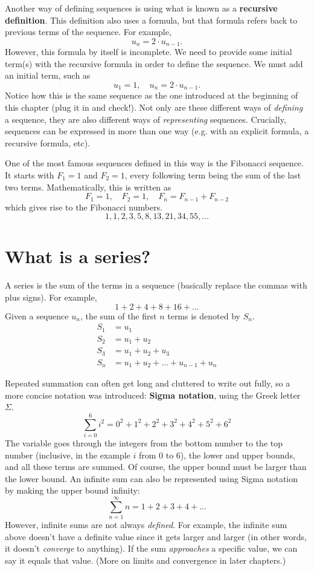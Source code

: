 \documentclass[../../main.tex]{subfiles}
\begin{document}
Another way of defining sequences is using what is known as a \textbf{recursive definition}. This definition also uses a formula, but that formula refers back to previous terms of the sequence. For example,
\[
    u_n = 2\cdot u_{n-1}.
\]
However, this formula by itself is incomplete. We need to provide some initial term(s) with the recursive formula in order to define the sequence. We must add an initial term, such as
\[
    u_1 = 1,\quad u_n = 2\cdot u_{n-1}.
\]
Notice how this is the same sequence as the one introduced at the beginning of this chapter (plug it in and check!). Not only are these different ways of \emph{defining} a sequence, they are also different ways of \emph{representing} sequences. Crucially, sequences can be expressed in more than one way (e.g. with an explicit formula, a recursive formula, etc).

One of the most famous sequences defined in this way is the Fibonacci sequence. It starts with \(F_1 = 1\) and \(F_2 = 1\), every following term being the sum of the last two terms. Mathematically, this is written as
\[
    F_1 = 1,\quad F_2 = 1,\quad F_n = F_{n-1} + F_{n-2}
\]
which gives rise to the Fibonacci numbers.
\[
    1, 1, 2, 3, 5, 8, 13, 21, 34, 55, \ldots
\]

\section{What is a series?}

A series is the sum of the terms in a sequence (basically replace the commas with plus signs). For example,
\[
    1+2+4+8+16+\ldots
\]
Given a sequence \( u_n\), the sum of the first \(n\) terms is denoted by \(S_n\).
\begin{align}
    S_1 &= u_1\\
    S_2 &= u_1 + u_2\\
    S_3 &= u_1 + u_2 + u_3\\
    S_n &= u_1 + u_2 + \ldots + u_{n-1} + u_n
\end{align}

Repeated summation can often get long and cluttered to write out fully, so a more concise notation was introduced: \textbf{Sigma notation}, using the Greek letter \(\Sigma\).
\[
    \sum_{i=0}^6i^2 = 0^2 + 1^2 + 2^2 + 3^2 + 4^2 + 5^2 + 6^2
\]
The variable goes through the integers from the bottom number to the top number (inclusive, in the example \(i\) from 0 to 6), the lower and upper bounds, and all these terms are summed. Of course, the upper bound must be larger than the lower bound. An infinite sum can also be represented using Sigma notation by making the upper bound infinity:
\[
    \sum_{n=1}^{\infty}n = 1 + 2 + 3 + 4 + \ldots
\]
However, infinite sums are not always \emph{defined}. For example, the infinite sum above doesn't have a definite value since it gets larger and larger (in other words, it doesn't \emph{converge} to anything). If the sum \emph{approaches} a specific value, we can say it equals that value. (More on limits and convergence in later chapters.)
\end{document}
